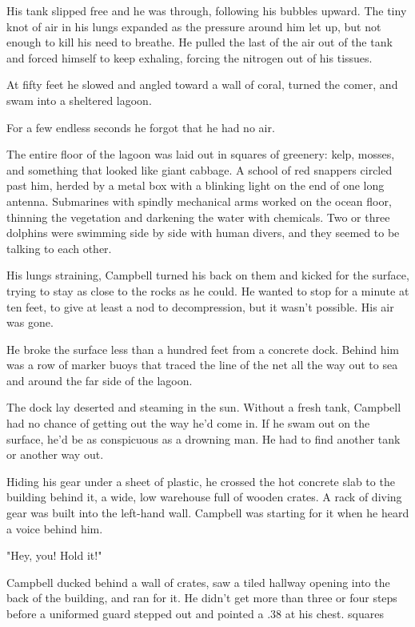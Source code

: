 His tank slipped free and he was through, following his bubbles upward. The tiny knot of air in his lungs expanded as the pressure around him let up, but not enough to kill his need to breathe. He pulled the last of the air out of the tank and forced himself to keep exhaling, forcing the nitrogen out of his tissues.

At fifty feet he slowed and angled toward a wall of coral, turned the comer, and swam into a sheltered lagoon.

For a few endless seconds he forgot that he had no air.

The entire floor of the lagoon was laid out in squares of greenery: kelp, mosses, and something that looked like giant cabbage. A school of red snappers circled past him, herded by a metal box with a blinking light on the end of one long antenna. Submarines with spindly mechanical arms worked on the ocean floor, thinning the vegetation and darkening the water with chemicals. Two or three dolphins were swimming side by side with human divers, and they seemed to be talking to each other.

His lungs straining, Campbell turned his back on them and kicked for the surface, trying to stay as close to the rocks as he could. He wanted to stop for a minute at ten feet, to give at least a nod to decompression, but it wasn't possible. His air was gone.

He broke the surface less than a hundred feet from a concrete dock. Behind him was a row of marker buoys that traced the line of the net all the way out to sea and around the far side of the lagoon.

The dock lay deserted and steaming in the sun. Without a fresh tank, Campbell had no chance of getting out the way he'd come in. If he swam out on the surface, he'd be as conspicuous as a drowning man. He had to find another tank or another way out.

Hiding his gear under a sheet of plastic, he crossed the hot concrete slab to the building behind it, a wide, low warehouse full of wooden crates. A rack of diving gear was built into the left-hand wall. Campbell was starting for it when he heard a voice behind him.

"Hey, you! Hold it!"

Campbell ducked behind a wall of crates, saw a tiled hallway opening into the back of the building, and ran for it. He didn't get more than three or four steps before a uniformed guard stepped out and pointed a .38 at his chest.
squares

